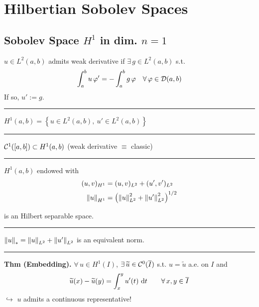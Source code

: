 

\section{\texorpdfstring{\color{forestgreen(web)}Hilbertian Sobolev Spaces}{}}



\subsection{\texorpdfstring{\color{red}Sobolev Space \texorpdfstring{$H^1$}{C} in dim. \texorpdfstring{$n=1$}{C}}{}}


$u\in L^2(a,b)$ admits weak derivative if $\exists\,g\in L^2(a,b)$ s.t.
\begin{equation*}
\int_a^b u\,\varphi'=-\int_a^b g\,\varphi\quad\forall\, \varphi\in \mathcal{D}(a,b)
\end{equation*}
If so, $u':=g$.

\rule{0.31\textwidth}{0.2pt}
\smallskip

$H^1(a,b) = \left\{ u\in L^2(a,b),\ u'\in L^2(a,b) \right\}$

\rule{0.31\textwidth}{0.2pt}
\smallskip

$\mathcal{C}^1([a,b])\subset H^1(a,b)$ (weak derivative $\equiv$ classic)

\rule{0.31\textwidth}{0.2pt}
\smallskip

$H^1(a,b)$ endowed with
\begin{align*}
(u,v)_{H^1}&=(u,v)_{L^2}+(u',v')_{L^2} \\
\left\lVert u \right\rVert_{H^1}&=\left( \left\lVert u \right\rVert^2_{L^2}+\left\lVert u' \right\rVert^2_{L^2} \right)^{1/2}
\end{align*}

is an Hilbert separable space.

\rule{0.31\textwidth}{0.2pt}
\smallskip

$\left\lVert u \right\rVert_{*}=\left\lVert u \right\rVert_{L^2}+\left\lVert u' \right\rVert
_{L^2}$ is an equivalent norm.

\rule{0.31\textwidth}{0.2pt}
\smallskip

\textbf{Thm (Embedding).} $\forall\,u\in H^1(I)$, $\exists\,\widetilde{u}\in\mathcal{C}^0(\overline{I})$ s.t. $u=\widetilde{u}$ a.e. on $I$ and 
\begin{equation*}
\widetilde{u}(x)-\widetilde{u}(y)=\int_x^y u'(t)\  \mathrm{d} t\qquad\forall\, x,y\in \overline{I}
\end{equation*}
$\hookrightarrow$ $u$ admits a continuous representative!

